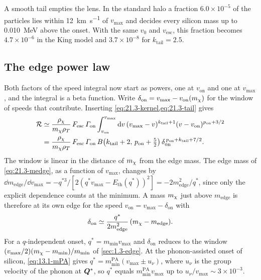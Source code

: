 A smooth tail empties the lens. In the standard halo a fraction $6.0\times10^{-5}$ of the particles lies within \SI{12}{km.s^{-1}} of $v_{\mathrm{max}}$ and decides every silicon mass up to \SI{0.010}{MeV} above the onset. With the same $v_0$ and $v_{\mathrm{esc}}$, this fraction becomes $4.7\times10^{-6}$ in the King model and $3.7\times10^{-8}$ for $k_{\mathrm{tail}} = 2.5$.

\subsection{The edge power law}\label{sec:21.3-power}

Both factors of the speed integral now start as powers, one at $v_{\mathrm{on}}$ and one at $v_{\mathrm{max}}$, and the integral is a beta function. Write $\delta_{\mathrm{on}} = v_{\mathrm{max}} - v_{\mathrm{on}}(m_{\chi})$ for the window of speeds that contribute. Inserting \cref{eq:21.3-kernel,eq:21.3-tail} gives
\begin{equation*}
  \begin{aligned}
  \mathcal{R} &\simeq \frac{\rho_\chi}{m_{\chi}\rho_T}\,F_{\mathrm{esc}}\,\varGamma_{\mathrm{on}}\int_{v_{\mathrm{on}}}^{v_{\mathrm{max}}}\mathrm{d} v\,(v_{\mathrm{max}} - v)^{k_{\mathrm{tail}}+1}(v - v_{\mathrm{on}})^{p_{\mathrm{on}}+3/2} \\
  &= \frac{\rho_\chi}{m_{\chi}\rho_T}\,F_{\mathrm{esc}}\,\varGamma_{\mathrm{on}}\,B\bigl(k_{\mathrm{tail}}+2,\, p_{\mathrm{on}}+\tfrac52\bigr)\,\delta_{\mathrm{on}}^{\,p_{\mathrm{on}}+k_{\mathrm{tail}}+7/2} .
  \end{aligned}
\end{equation*}
The window is linear in the distance of $m_{\chi}$ from the edge mass. The edge mass of \cref{eq:21.3-medge}, as a function of $v_{\mathrm{max}}$, changes by $\dd m_{\mathrm{edge}}/\dd v_{\mathrm{max}} = -q^{*3}/[2(q^*v_{\mathrm{max}} - E_{\mathrm{th}}(q^*))^2] = -2m_{\mathrm{edge}}^2/q^*$, since only the explicit dependence counts at the minimum. A mass $m_{\chi}$ just above $m_{\mathrm{edge}}$ is therefore at its own edge for the speed $v_{\mathrm{on}} = v_{\mathrm{max}} - \delta_{\mathrm{on}}$ with
\begin{equation*}
  \delta_{\mathrm{on}} \simeq \frac{q^*}{2m_{\mathrm{edge}}^2}\,(m_{\chi} - m_{\mathrm{edge}}) .
\end{equation*}
For a $q$-independent onset, $q^* = m_{\mathrm{min}}v_{\mathrm{max}}$ and $\delta_{\mathrm{on}}$ reduces to the window $(v_{\mathrm{max}}/2)(m_{\chi} - m_{\mathrm{min}})/m_{\mathrm{min}}$ of \cref{sec:1.3-edge}. At the phonon-assisted onset of silicon, \cref{eq:13.1-mPA} gives $q^* = m_{\mathrm{min}}^{\mathrm{PA}}(v_{\mathrm{max}} \pm u_\nu)$, where $u_\nu$ is the group velocity of the phonon at $\bm{Q}^*$, so $q^*$ equals $m_{\mathrm{min}}^{\mathrm{PA}}v_{\mathrm{max}}$ up to $u_\nu/v_{\mathrm{max}} \sim 3\times10^{-3}$.

